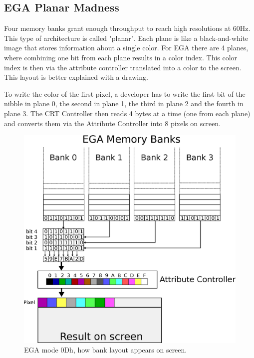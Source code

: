 \documentclass[book.tex]{subfiles}
\begin{document}
\subsection{EGA Planar Madness}
\label{section:EGA_Planar_Madness}

Four memory banks grant enough throughput to reach high resolutions at 60Hz. This type of architecture is called "planar". Each plane is like a black-and-white image that stores information about a single color. For EGA there are 4 planes, where combining one bit from each plane results in a color index. This color index is then via the attribute controller translated into a color to the screen. This layout is better explained with a drawing.\\

\par
To write the color of the first pixel, a developer has to write the first bit of the nibble in plane 0, the second in plane 1, the third in plane 2 and the fourth in plane 3. The CRT Controller then reads 4 bytes at a time (one from each plane) and converts them via the Attribute Controller into 8 pixels on screen. \\


\begin{figure}[H]
\centering
 \includegraphics[width=1.0\textwidth]{imgs/drawings/mode0Dh.eps}
\caption{EGA mode 0Dh, how bank layout appears on screen.}
\label{fig:ega_bank_layout}
\end{figure}
 
\end{document}
